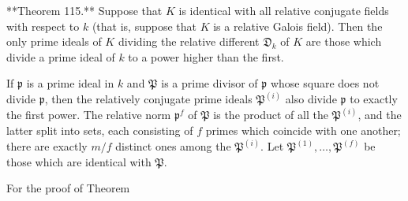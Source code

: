 **Theorem 115.** Suppose that $K$ is identical with all relative conjugate fields with respect to $k$ (that is, suppose that $K$ is a relative Galois field). Then the only prime ideals of $K$ dividing the relative different $\mathfrak{D}_k$ of $K$ are those which divide a prime ideal of $k$ to a power higher than the first.

If $\mathfrak{p}$ is a prime ideal in $k$ and $\mathfrak{P}$ is a prime divisor of $\mathfrak{p}$ whose square does not divide $\mathfrak{p}$, then the relatively conjugate prime ideals $\mathfrak{P}^{(i)}$ also divide $\mathfrak{p}$ to exactly the first power. The relative norm $\mathfrak{p}^f$ of $\mathfrak{P}$ is the product of all the $\mathfrak{P}^{(i)}$, and the latter split into sets, each consisting of $f$ primes which coincide with one another; there are exactly $m/f$ distinct ones among the $\mathfrak{P}^{(i)}$. Let $\mathfrak{P}^{(1)}, \ldots, \mathfrak{P}^{(f)}$ be those which are identical with $\mathfrak{P}$.

For the proof of Theorem
